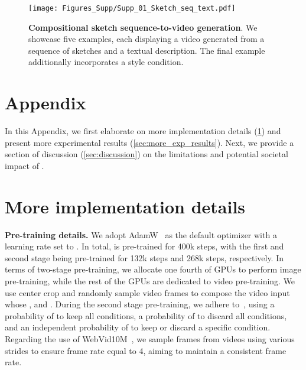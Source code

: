 

\begin{figure}[t]
    \centering
    \texttt{[image: Figures\_Supp/Supp\_01\_Sketch\_seq\_text.pdf]}
     \vspace{-1.5em}
    \caption{
    \small
    \textbf{Compositional sketch sequence-to-video generation}.
    We showcase five examples, each displaying a video generated from a sequence of sketches and a textual description.
    The final example additionally incorporates a style condition.
    }
    \label{fig:sketch_sequence}
    \vspace{-5mm}
\end{figure}



\appendix
\section*{Appendix}
In this Appendix, we first elaborate on more implementation details (\cref{sec:more_imple_details}) and present more experimental results  (\cref{sec:more_exp_results}).
Next, we provide a section of discussion (\cref{sec:discussion}) on the limitations and potential societal impact of \method. 



\section{More implementation details}
\label{sec:more_imple_details}

\textbf{Pre-training details.}
We adopt AdamW~\cite{loshchilov2017AdamW} as the default optimizer with a learning rate set to .
In total, \method is pre-trained for 400k steps, with the first and second stage being pre-trained for 132k steps and 268k steps, respectively.
In terms of two-stage pre-training, we allocate one fourth of GPUs to perform image pre-training, while the rest of the GPUs are dedicated to video pre-training.
We use center crop and randomly sample video frames to compose the video input whose ,  and .
During the second stage pre-training, we adhere to~\cite{huang2023composer}, using a probability of  to keep all conditions, a probability of  to discard all conditions, and an independent probability of  to keep or discard a specific condition.
Regarding the use of WebVid10M~\cite{2021Frozen}, we sample frames from videos using various strides to ensure frame rate equal to 4, aiming to maintain a consistent frame rate.


